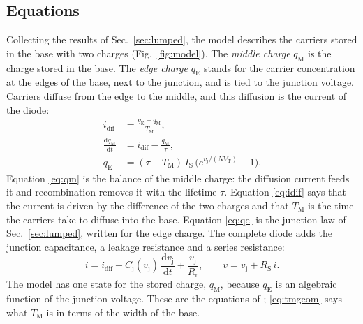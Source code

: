 \documentclass[10pt,a4paper]{scrartcl}
\newcommand{\TM}{T_\mathrm{M}}
\newcommand{\qE}{q_\mathrm{E}}
\newcommand{\qM}{q_\mathrm{M}}
\newcommand{\idif}{i_\mathrm{dif}}
\newcommand{\vj}{v_\mathrm{j}}
\newcommand{\IS}{I_\mathrm{S}}
\newcommand{\RS}{R_\mathrm{S}}
\newcommand{\Rr}{R_\mathrm{r}}
\newcommand{\VT}{V_\mathrm{T}}
\newcommand{\Cj}{C_\mathrm{j}}
\newcommand{\diff}{\mathrm{d}}
\newcommand{\Nem}{N}                          %
\begin{document}
\subsection{Equations}
Collecting the results of Sec.~\ref{sec:lumped}, the model describes the carriers stored in the base with two charges (Fig.~\ref{fig:model}). The \emph{middle charge} $\qM$ is the charge stored in the base. The \emph{edge charge} $\qE$ stands for the carrier concentration at the edges of the base, next to the junction, and is tied to the junction voltage. Carriers diffuse from the edge to the middle, and this diffusion is the current of the diode:
\begin{align}
\idif &= \frac{\qE - \qM}{\TM} , \label{eq:idif}\\
\frac{\diff \qM}{\diff t} &= \idif - \frac{\qM}{\tau} , \label{eq:qm}\\
\qE &= (\tau+\TM)\,\IS\,\bigl(e^{\vj/(\Nem\VT)} - 1\bigr) . \label{eq:qe}
\end{align}
Equation \eqref{eq:qm} is the balance of the middle charge: the diffusion current feeds it and recombination removes it with the lifetime $\tau$. Equation \eqref{eq:idif} says that the current is driven by the difference of the two charges and that $\TM$ is the time the carriers take to diffuse into the base. Equation \eqref{eq:qe} is the junction law of Sec.~\ref{sec:lumped}, written for the edge charge. The complete diode adds the junction capacitance, a leakage resistance and a series resistance:
\begin{equation}
i = \idif + \Cj(\vj)\,\frac{\diff \vj}{\diff t} + \frac{\vj}{\Rr} , \qquad v = \vj + \RS\, i .
\label{eq:terminal}
\end{equation}
The model has one state for the stored charge, $\qM$, because $\qE$ is an algebraic function of the junction voltage. These are the equations of \cite{lauritzen1991}; \eqref{eq:tmgeom} says what $\TM$ is in terms of the width of the base.
\end{document}
